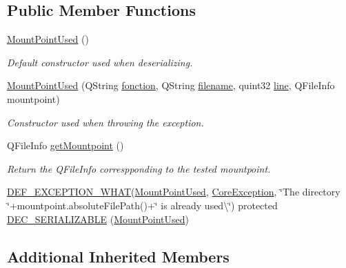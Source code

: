 \subsection*{Public Member Functions}
\begin{DoxyCompactItemize}
\item 
\hyperlink{class_gost_crypt_1_1_core_1_1_mount_point_used_a50dc2926de2e5279e905fca5ad39a264}{Mount\+Point\+Used} ()
\begin{DoxyCompactList}\small\item\em Default constructor used when deserializing. \end{DoxyCompactList}\item 
\hyperlink{class_gost_crypt_1_1_core_1_1_mount_point_used_a648134d5ad4d5edb9fced82fc7b3b982}{Mount\+Point\+Used} (Q\+String \hyperlink{class_gost_crypt_1_1_gost_crypt_exception_a29b8c93d5efbb1ff369107385725a939}{fonction}, Q\+String \hyperlink{class_gost_crypt_1_1_gost_crypt_exception_a749a12375f4ba9d502623b99d8252f38}{filename}, quint32 \hyperlink{class_gost_crypt_1_1_gost_crypt_exception_abf506d911f12a4e969eea500f90bd32c}{line}, Q\+File\+Info mountpoint)
\begin{DoxyCompactList}\small\item\em Constructor used when throwing the exception. \end{DoxyCompactList}\item 
Q\+File\+Info \hyperlink{class_gost_crypt_1_1_core_1_1_mount_point_used_a97471ef44eec2ae56c802f45447235f4}{get\+Mountpoint} ()
\begin{DoxyCompactList}\small\item\em Return the Q\+File\+Info correspponding to the tested mountpoint. \end{DoxyCompactList}\item 
\hyperlink{_gost_crypt_exception_8h_a5bc1e1c6c9d6f46c84eeba49e33355f9}{D\+E\+F\+\_\+\+E\+X\+C\+E\+P\+T\+I\+O\+N\+\_\+\+W\+H\+AT}(\hyperlink{class_gost_crypt_1_1_core_1_1_mount_point_used}{Mount\+Point\+Used}, \hyperlink{class_gost_crypt_1_1_core_1_1_core_exception}{Core\+Exception}, \char`\"{}The directory \char`\"{}+mountpoint.\+absolute\+File\+Path()+\char`\"{} is already used\textbackslash{}\char`\"{}) protected \hyperlink{class_gost_crypt_1_1_core_1_1_mount_point_used_a1b47051119915e07959f49da6f19c29d}{D\+E\+C\+\_\+\+S\+E\+R\+I\+A\+L\+I\+Z\+A\+B\+LE} (\hyperlink{class_gost_crypt_1_1_core_1_1_mount_point_used}{Mount\+Point\+Used})
\end{DoxyCompactItemize}
\subsection*{Additional Inherited Members}


